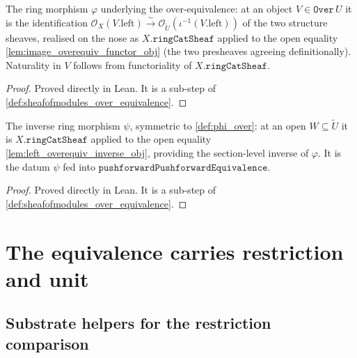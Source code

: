 \begin{definition}\leanok
  \label{def:phi_over}
  The ring morphism \(\varphi\) underlying the over-equivalence: at an object
  \(V \in \mathtt{Over}\,U\) it is the identification
  \(\mathcal{O}_X(V.\mathrm{left}) \xrightarrow{\sim}
  \mathcal{O}_{\widetilde{U}}(\iota^{-1}(V.\mathrm{left}))\) of the two structure
  sheaves, realised on the nose as \(X.\mathtt{ringCatSheaf}\) applied to the open
  equality \cref{lem:image_overequiv_functor_obj} (the two presheaves agreeing
  definitionally). Naturality in \(V\) follows from functoriality of
  \(X.\mathtt{ringCatSheaf}\).
\end{definition}

\begin{proof}
  \leanok
  Proved directly in Lean. It is a sub-step of
  \cref{def:sheafofmodules_over_equivalence}.
\end{proof}

\begin{definition}\leanok
  \label{def:psi_over}
  The inverse ring morphism \(\psi\), symmetric to \cref{def:phi_over}: at an open
  \(W \subseteq \widetilde{U}\) it is \(X.\mathtt{ringCatSheaf}\) applied to the open
  equality \cref{lem:left_overequiv_inverse_obj}, providing the section-level inverse
  of \(\varphi\). It is the datum \(\psi\) fed into
  \(\mathtt{pushforwardPushforwardEquivalence}\).
\end{definition}

\begin{proof}
  \leanok
  Proved directly in Lean. It is a sub-step of
  \cref{def:sheafofmodules_over_equivalence}.
\end{proof}

\section{The equivalence carries restriction and unit}
\label{sec:soe_consumers}

\subsection{Substrate helpers for the restriction comparison}
\label{sec:soe_consumers_helpers}

